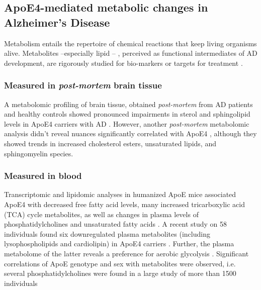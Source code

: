 \documentclass{amsart}
\theoremstyle{plain}
\begin{document}
\subsection{ApoE4-mediated metabolic changes in Alzheimer's Disease}
Metabolism entails the repertoire of chemical reactions that keep living organisms alive. Metabolites  --especially lipid \cite{Barupal2019SetsPathophysiology,Fernandez-Calle2022APOEDiseases, Proitsi2017AssociationAnalysis}-- , perceived as functional intermediates of AD development, are rigorously studied for bio-markers or targets for treatment \cite{Oeckl2019GlialImpairment}.
 
\subsubsection{Measured in \textit{post-mortem} brain tissue}A metabolomic profiling of brain tissue, obtained \textit{post-mortem} from AD patients and healthy controls showed  pronounced impairments in sterol and sphingolipid levels in ApoE4 carriers with AD  \cite{Bandaru2009ApoE4Brain}. However, another \textit{post-mortem} metabolomic analysis didn't reveal nuances significantly correlated with ApoE4 \cite{Novotny2023MetabolomicBrains}, although they showed trends in increased cholesterol esters, unsaturated lipids, and sphingomyelin species.

\subsubsection{Measured in blood}
Transcriptomic and lipidomic analyses in humanized ApoE mice associated ApoE4 with decreased free fatty acid levels, many increased  tricarboxylic acid (TCA) cycle metabolites, as well as changes in plasma levels of phosphatidylcholines and unsaturated fatty acids \cite{Area-Gomez2020APOE4Mice, Zhao2020AlzheimersPathways}. A recent study on 58 individuals found six downregulated plasma metabolites (including lysophospholipids and cardiolipin) in ApoE4 carriers \cite{pena-bautista2020MetabolomicsEffect}. Further, the plasma metabolome of the latter reveals a preference for aerobic glycolysis \cite{Farmer2021APO4Glycolysis}. Significant correlations of ApoE genotype and sex with metabolites were observed, i.e. several phosphatidylcholines were found in a large study of more than 1500 individuals \cite{Arnold2020SexMetabolome}
\end{document}
